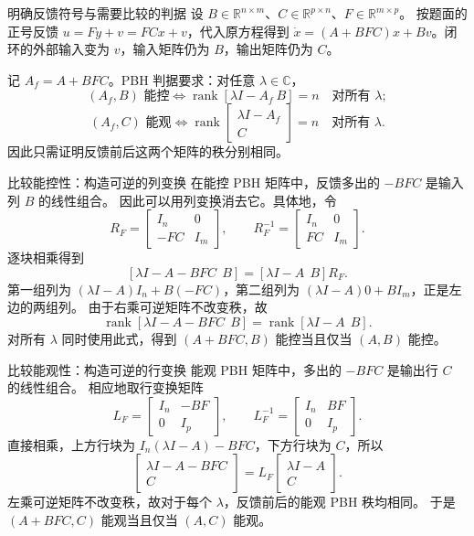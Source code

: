 \documentclass[11pt]{article}
\begin{document}
\begin{solution}
\begin{proofstep}{明确反馈符号与需要比较的判据}
设 $B\in\mathbb R^{n\times m}$、$C\in\mathbb R^{p\times n}$、$F\in\mathbb R^{m\times p}$。
按题面的正号反馈 $u=Fy+v=FCx+v$，代入原方程得到
$\dot x=(A+BFC)x+Bv$。闭环的外部输入变为 $v$，输入矩阵仍为 $B$，输出矩阵仍为 $C$。

记 $A_f=A+BFC$。PBH 判据要求：对任意 $\lambda\in\mathbb C$，
\[
(A_f,B)\text{ 能控}\iff
\operatorname{rank}[\lambda I-A_f\ B]=n\quad\text{对所有 }\lambda;
\]
\[
(A_f,C)\text{ 能观}\iff
\operatorname{rank}\begin{bmatrix}\lambda I-A_f\\C\end{bmatrix}=n
\quad\text{对所有 }\lambda.
\]
因此只需证明反馈前后这两个矩阵的秩分别相同。
\end{proofstep}

\begin{proofstep}{比较能控性：构造可逆的列变换}
在能控 PBH 矩阵中，反馈多出的 $-BFC$ 是输入列 $B$ 的线性组合。
因此可以用列变换消去它。具体地，令
\[
R_F=\begin{bmatrix}I_n&0\\-FC&I_m\end{bmatrix},\qquad
R_F^{-1}=\begin{bmatrix}I_n&0\\FC&I_m\end{bmatrix}.
\]
逐块相乘得到
\[
[\lambda I-A-BFC\ \ B]
=[\lambda I-A\ \ B]
R_F.
\]
第一组列为 $(\lambda I-A)I_n+B(-FC)$，第二组列为
$(\lambda I-A)0+BI_m$，正是左边的两组列。
由于右乘可逆矩阵不改变秩，故
\[
\operatorname{rank}[\lambda I-A-BFC\ \ B]
=\operatorname{rank}[\lambda I-A\ \ B].
\]
对所有 $\lambda$ 同时使用此式，得到
$(A+BFC,B)$ 能控当且仅当 $(A,B)$ 能控。
\end{proofstep}

\begin{proofstep}{比较能观性：构造可逆的行变换}
能观 PBH 矩阵中，多出的 $-BFC$ 是输出行 $C$ 的线性组合。
相应地取行变换矩阵
\[
L_F=\begin{bmatrix}I_n&-BF\\0&I_p\end{bmatrix},\qquad
L_F^{-1}=\begin{bmatrix}I_n&BF\\0&I_p\end{bmatrix}.
\]
直接相乘，上方行块为 $I_n(\lambda I-A)-BFC$，下方行块为 $C$，所以
\[
\begin{bmatrix}\lambda I-A-BFC\\C\end{bmatrix}
=L_F\begin{bmatrix}\lambda I-A\\C\end{bmatrix}.
\]
左乘可逆矩阵不改变秩，故对于每个 $\lambda$，反馈前后的能观 PBH 秩均相同。
于是 $(A+BFC,C)$ 能观当且仅当 $(A,C)$ 能观。
\end{proofstep}


\end{solution}
\end{document}
